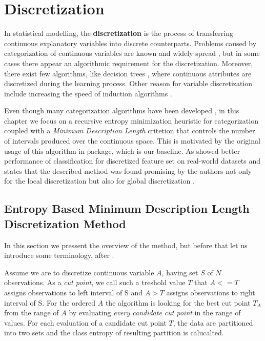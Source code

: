\section{Discretization}\label{discretization}

In statistical modelling, the \textbf{discretization} is the process of
transferring continuous explanatory variables into discrete
counterparts. Problems caused by categorization of continuous variables
are known and widely spread \citep{HarrellDISC}, but in some cases there
appear an algorithmic requirement for the discretization. Moreover,
there exist few algorithms, like decision trees \citep{Salzberg1994},
where continuous attributes are discretized during the learning process.
Other reason for variable discretization include increasing the speed of
induction algorithms \citep{Catlett1991}. \par Even though many
categorization algorithms have been developed
\citep{Holte1993, Chan169942}, in this chapter we focus on a recursive
entropy minimization heuristic for categorization coupled with a
\emph{Minimum Description Length} critetion \citep{rissanen1986} that
controls the number of intervals produced over the continuous space.
This is motivated by the original usage of this algorithm in
 package, which is our baseline. As
\cite{Dougherty95supervisedand} showed better performance of
classification for discretized feature set on real-world datasets and
states that the described method was found promising by the authors not
only for the local discretization but also for global discretization
\citep{Ting94discretizationof}.

\subsection{Entropy Based Minimum Description Length Discretization
Method}\label{entropy-based-minimum-description-length-discretization-method}

In this section we pressent the overview of the method, but before that
let us introduce some terminology, after \citep{Fayyad1993}.

\par 

Assume we are to discretize continuous variable \(A\), having set \(S\)
of \(N\) observations. As a \emph{cut point}, we call such a treshold
value \(T\) that \(A<=T\) assigns observations to left interval of S and
\(A>T\) assigns observations to right interval of
S.
For the ordered \(A\) the algorithm is looking for the best cut point
\(T_A\) from the range of \(A\) by evaluating \emph{every candidate cut
point} in the range of values. For each evaluation of a candidate cut
point \(T\), the data are partitioned into two sets and the class
entropy of resulting partition is calucalted.

